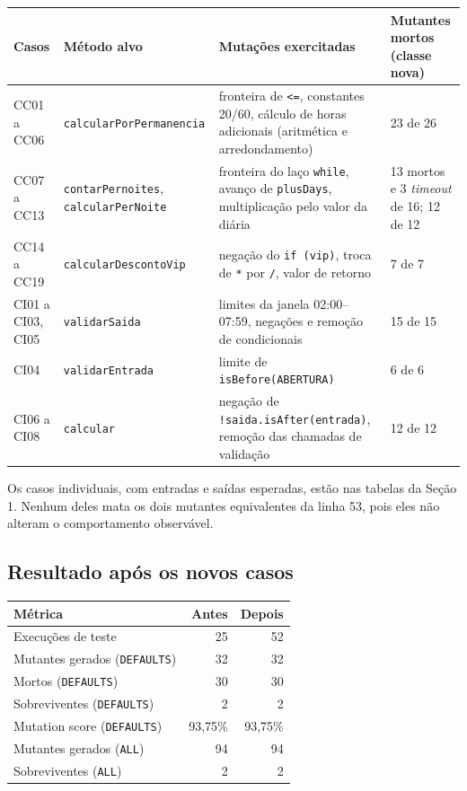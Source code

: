 \documentclass[11pt,a4paper]{article}
\begin{document}
\small
\begin{longtable}{@{}p{2.3cm} p{4.5cm} p{4.9cm} p{3.0cm}@{}}
\toprule
Casos & Método alvo & Mutações exercitadas & Mutantes mortos (classe nova) \\
\midrule
\endhead
CC01 a CC06 & \texttt{calcularPorPermanencia} & fronteira de \texttt{<=}, constantes 20/60, cálculo de horas adicionais (aritmética e arredondamento) & 23 de 26 \\
CC07 a CC13 & \texttt{contarPernoites}, \texttt{calcularPerNoite} & fronteira do laço \texttt{while}, avanço de \texttt{plusDays}, multiplicação pelo valor da diária & 13 mortos e 3 \emph{timeout} de 16; 12 de 12 \\
CC14 a CC19 & \texttt{calcularDescontoVip} & negação do \texttt{if (vip)}, troca de \texttt{*} por \texttt{/}, valor de retorno & 7 de 7 \\
CI01 a CI03, CI05 & \texttt{validarSaida} & limites da janela 02:00--07:59, negações e remoção de condicionais & 15 de 15 \\
CI04 & \texttt{validarEntrada} & limite de \texttt{isBefore(ABERTURA)} & 6 de 6 \\
CI06 a CI08 & \texttt{calcular} & negação de \texttt{!saida.isAfter(entrada)}, remoção das chamadas de validação & 12 de 12 \\
\bottomrule
\end{longtable}
\normalsize

Os casos individuais, com entradas e saídas esperadas, estão nas tabelas da
Seção 1. Nenhum deles mata os dois mutantes equivalentes da linha 53, pois eles
não alteram o comportamento observável.

\subsection{Resultado após os novos casos}

\begin{center}
\begin{tabular}{lrr}
\toprule
Métrica & Antes & Depois \\
\midrule
Execuções de teste & 25 & 52 \\
Mutantes gerados (\texttt{DEFAULTS}) & 32 & 32 \\
Mortos (\texttt{DEFAULTS}) & 30 & 30 \\
Sobreviventes (\texttt{DEFAULTS}) & 2 & 2 \\
Mutation score (\texttt{DEFAULTS}) & 93,75\% & 93,75\% \\
Mutantes gerados (\texttt{ALL}) & 94 & 94 \\
Sobreviventes (\texttt{ALL}) & 2 & 2 \\
\bottomrule
\end{tabular}
\end{center}
\end{document}

